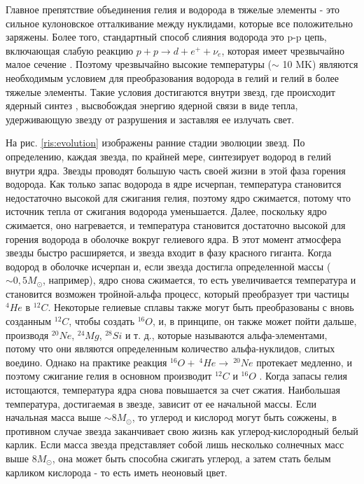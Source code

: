 \documentclass[14pt, a4paper]{article}
\numberwithin{figure}{section}
\numberwithin{equation}{section}
\begin{document}
Главное препятствие объединения гелия и водорода в тяжелые элементы - это сильное кулоновское отталкивание между нуклидами, которые все положительно заряжены. Более того, стандартный способ слияния водорода это p-p цепь, включающая слабую реакцию $p + p \rightarrow d + e^+ + \nu_e$, которая имеет чрезвычайно малое сечение \cite{cauldrons}. Поэтому чрезвычайно высокие температуры ($\sim$ 10 MK) являются необходимым условием для преобразования водорода в гелий и гелий в более тяжелые элементы. Такие условия достигаются внутри звезд, где происходит ядерный синтез \cite{energy}, высвобождая энергию ядерной связи в виде тепла, удерживающую звезду от разрушения и заставляя ее излучать свет.

На рис. \ref{ris:evolution} изображены ранние стадии эволюции звезд. По определению, каждая звезда, по крайней мере, синтезирует водород в гелий внутри ядра. Звезды проводят большую часть своей жизни в этой фаза горения водорода. Как только запас водорода в ядре исчерпан, температура становится недостаточно высокой для сжигания гелия, поэтому ядро сжимается, потому что источник тепла от сжигания водорода уменьшается. Далее, поскольку ядро сжимается, оно нагревается, и температура становится достаточно высокой для горения водорода в оболочке вокруг гелиевого ядра. В этот момент атмосфера звезды быстро расширяется, и звезда входит в фазу красного гиганта. Когда водород в оболочке исчерпан и, если звезда достигла определенной массы ($\sim 0,5 M_\odot$, например), ядро снова сжимается, то есть увеличивается температура и становится возможен тройной-альфа процесс, который  преобразует три частицы $^4He$ в $^{12}C$. Некоторые гелиевые сплавы также могут быть преобразованы с вновь созданным $^{12}C$, чтобы создать $^{16}O$, и, в принципе, он также может пойти дальше, производя $^{20}Ne$, $^{24}Mg$, $^{28}Si$ и т. д., которые называются альфа-элементами, потому что они являются определенным количество альфа-нуклидов, слитых воедино. Однако на практике реакция $^{16}O + \ ^4He \rightarrow \ ^{20}Ne$ протекает медленно, и поэтому сжигание гелия в основном производит $^{12}C$ и $^{16}O$ \cite{interiors}. Когда запасы гелия истощаются, температура ядра снова повышается за счет сжатия. Наибольшая температура, достигаемая в звезде, зависит от ее начальной массы. Если начальная масса выше $\sim 8 M_\odot$, то углерод и кислород могут быть сожжены, в противном случае звезда заканчивает свою жизнь как углерод-кислородный белый карлик. Если масса звезда представляет собой лишь несколько солнечных масс выше $8 M_\odot$, она может быть способна сжигать углерод, а затем стать белым карликом кислорода - то есть иметь неоновый цвет.
\end{document}
